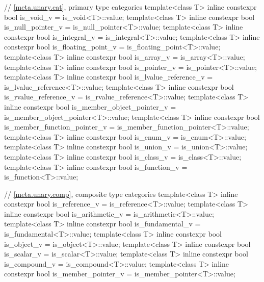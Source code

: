 \begin{codeblock}
{  // \ref{meta.unary.cat}, primary type categories
  template<class T>
    inline constexpr bool is_void_v = is_void<T>::value;
  template<class T>
    inline constexpr bool is_null_pointer_v = is_null_pointer<T>::value;
  template<class T>
    inline constexpr bool is_integral_v = is_integral<T>::value;
  template<class T>
    inline constexpr bool is_floating_point_v = is_floating_point<T>::value;
  template<class T>
    inline constexpr bool is_array_v = is_array<T>::value;
  template<class T>
    inline constexpr bool is_pointer_v = is_pointer<T>::value;
  template<class T>
    inline constexpr bool is_lvalue_reference_v = is_lvalue_reference<T>::value;
  template<class T>
    inline constexpr bool is_rvalue_reference_v = is_rvalue_reference<T>::value;
  template<class T>
    inline constexpr bool is_member_object_pointer_v = is_member_object_pointer<T>::value;
  template<class T>
    inline constexpr bool is_member_function_pointer_v = is_member_function_pointer<T>::value;
  template<class T>
    inline constexpr bool is_enum_v = is_enum<T>::value;
  template<class T>
    inline constexpr bool is_union_v = is_union<T>::value;
  template<class T>
    inline constexpr bool is_class_v = is_class<T>::value;
  template<class T>
    inline constexpr bool is_function_v = is_function<T>::value;

  // \ref{meta.unary.comp}, composite type categories
  template<class T>
    inline constexpr bool is_reference_v = is_reference<T>::value;
  template<class T>
    inline constexpr bool is_arithmetic_v = is_arithmetic<T>::value;
  template<class T>
    inline constexpr bool is_fundamental_v = is_fundamental<T>::value;
  template<class T>
    inline constexpr bool is_object_v = is_object<T>::value;
  template<class T>
    inline constexpr bool is_scalar_v = is_scalar<T>::value;
  template<class T>
    inline constexpr bool is_compound_v = is_compound<T>::value;
  template<class T>
    inline constexpr bool is_member_pointer_v = is_member_pointer<T>::value;

}
\end{codeblock}
